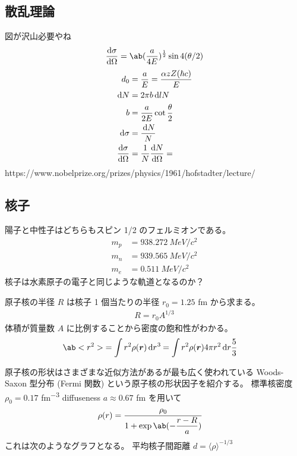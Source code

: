 \documentclass[uplatex,dvipdfmx,a4paper,11pt]{jlreq}
\newcommand{\rr}{\bm{r}}
\numberwithin{equation}{section}
\theoremstyle{definition}
\begin{document}
\subsection{散乱理論}
図が沢山必要やね
\begin{align}
  \diff{\sigma}{\Omega} = \ab(\frac{a}{4E})^{\frac{1}{2}}\sin4(\theta/2)
\end{align}
\begin{align}
  d_0                   & = \frac{a}{E} = \frac{\alpha z Z(\hbar c)}{E} \\
  \dl{N}                & = 2\pi b\dl{l}N                               \\
  b                     & = \frac{a}{2E}\cot\frac{\theta}{2}            \\
  \dl{\sigma}           & = \frac{\dl{N}}{N}                            \\
  \diff{\sigma}{\Omega} & = \frac{1}{N}\diff{N}{\Omega} =
\end{align}
https://www.nobelprize.org/prizes/physics/1961/hofstadter/lecture/

\subsection{核子}
陽子と中性子はどちらもスピン 1/2 のフェルミオンである。
\begin{align}
  m_p & = 938.272\ \si{MeV/c^2} \\
  m_n & = 939.565\ \si{MeV/c^2} \\
  m_e & = 0.511\ \si{MeV/c^2}
\end{align}
核子は水素原子の電子と同じような軌道となるのか？

原子核の半径 $R$ は核子 1 個当たりの半径 $r_0 = 1.25$ \si{fm} から求まる。
\begin{align}
  R = r_0A^{1/3}
\end{align}
体積が質量数 $A$ に比例することから密度の飽和性がわかる。
\begin{align}
  \ab<r^2> & = \int r^2\rho(\rr)\dl[3]{r} = \int r^2\rho(\rr)4\pi r^2\dl{r}
  \frac{5}{3}
\end{align}

原子核の形状はさまざまな近似方法があるが最も広く使われている Woods-Saxon 型分布 (Fermi 関数) という原子核の形状因子を紹介する。
標準核密度 $\rho_0 = 0.17$ \si{fm^{-3}} diffuseness $a \approx 0.67$ \si{fm} を用いて
\begin{align}
  \rho(r) & = \frac{\rho_0}{1 + \exp\ab(-\dfrac{r - R}{a})}
\end{align}
これは次のようなグラフとなる。
平均核子間距離 $d = \langle\rho\rangle^{-1/3}$
\end{document}
